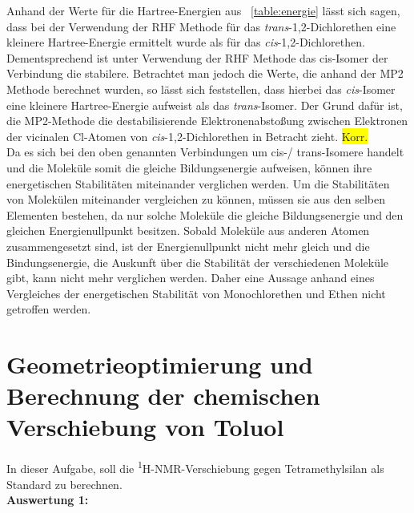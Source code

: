 \documentclass[12pt]{article}
\begin{document}
\begin{onehalfspace}
Anhand der Werte für die Hartree-Energien aus ~\ref{table:energie} lässt sich sagen, dass
bei der Verwendung der RHF Methode für das \textit{trans}-1,2-Dichlorethen eine
kleinere Hartree-Energie ermittelt wurde als für das \textit{cis}-1,2-Dichlorethen.
Dementsprechend ist unter Verwendung der RHF Methode das cis-Isomer der
Verbindung die stabilere. Betrachtet man jedoch die Werte, die anhand der MP2
Methode berechnet wurden, so lässt sich feststellen, dass hierbei das \textit{cis}-Isomer
eine kleinere Hartree-Energie aufweist als das \textit{trans}-Isomer. Der Grund dafür ist, die MP2-Methode die destabilisierende Elektronenabstoßung
 zwischen Elektronen der vicinalen Cl-Atomen von \textit{cis}-1,2-Dichlorethen in Betracht zieht. 
\colorbox{yellow}{Korr.}\\
 Da es sich bei den oben genannten Verbindungen um cis-/ trans-Isomere handelt und die Moleküle somit die gleiche Bildungsenergie aufweisen, können ihre
energetischen Stabilitäten miteinander verglichen werden. Um die
Stabilitäten von Molekülen miteinander vergleichen zu können, müssen sie aus
den selben Elementen bestehen, da nur solche Moleküle die gleiche
Bildungsenergie und den gleichen Energienullpunkt besitzen. Sobald Moleküle
aus anderen Atomen zusammengesetzt sind, ist der Energienullpunkt nicht mehr
gleich und die Bindungsenergie, die Auskunft über die Stabilität der verschiedenen Moleküle gibt, 
kann nicht mehr verglichen werden. Daher eine Aussage anhand eines Vergleiches der energetischen 
Stabilität von Monochlorethen und Ethen nicht getroffen werden.



\newpage

\section{Geometrieoptimierung und Berechnung der chemischen Verschiebung von Toluol}
In dieser Aufgabe, soll die \textsuperscript{1}H-NMR-Verschiebung gegen Tetramethylsilan als Standard zu berechnen. \\
\textbf{Auswertung 1:}

\begin{table}[!htpb]



\end{table}
\end{onehalfspace}
\end{document}
